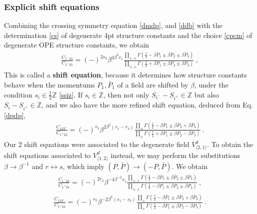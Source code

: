 \documentclass[12pt, a4paper]{article}
\newcommand{\myindex}[1]{\textbf{\boldmath #1}}
\theoremstyle{break}
\begin{document}
\subsubsection{Explicit shift equations}

Combining the crossing symmetry equation \eqref{dmdp}, and \eqref{ddb} with the determination \eqref{cs} of degenerate 4pt structure constants and the choice \eqref{cpcm} of degenerate OPE structure constants, we obtain
\begin{align}
 \boxed{\frac{C_{1^-23}}{C_{1^+23}} = 
 (-)^{2s_2}\beta^{4\beta^2r_1} \frac{\prod_{\pm,\pm}\Gamma\left(\tfrac12 -\beta\bar P_1\pm\beta \bar P_2\pm\beta \bar P_3\right)}{\prod_{\pm,\pm}
 \Gamma\left(\tfrac12 +\beta P_1\pm \beta P_2\pm\beta P_3\right)}} \ ,
 \label{sh-mp}
\end{align}
This is called a \myindex{shift equation}, because it determines how structure constants behave when the momentums $P_1,\bar P_1$ of a field are shifted by $\beta$, under the condition $s_i\in \frac12 \mathbb{Z}$ \eqref{ssiz}. If $s_i\in\mathbb{Z}$, then not only $S_{i^-}-S_{i^+}\in\mathbb{Z}$ but also $S_{i}-S_{i^+}\in\mathbb{Z}$, and we also have the more refined shift equation, deduced from Eq. \eqref{dpdp},
\begin{align}
 \boxed{\frac{C_{123^+}}{C_{1^+23}} = 
 (-)^{s_3} \beta^{2\beta^2(r_1-r_3)}
 \frac{ \prod_\pm\Gamma\left(\frac12 -\beta\bar P_1 \pm \beta\bar P_2 +\beta\bar P_3\right)}{ \prod_\pm\Gamma\left(\frac12+\beta P_1 \pm \beta P_2 -\beta P_3\right)}}\ .
 \label{sh-pp}
\end{align}
Our 2 shift equations were associated to the degenerate field $V^d_{\langle 2,1\rangle}$. To obtain the shift equations associated to $V^d_{\langle 1,2\rangle}$ instead, we may perform the substitutions $\beta\to \beta^{-1}$ and $r\leftrightarrow s$, which imply $(P,\bar P)\to (-P,\bar P)$. We obtain 
\begin{align}
 \frac{C_{1^-23}}{C_{1^+23}} = 
 (-)^{2r_2}\beta^{-4\beta^{-2}s_1} \frac{\prod_{\pm,\pm}\Gamma\left(\tfrac12 -\beta\bar P_1\pm\beta \bar P_2\pm\beta \bar P_3\right)}{\prod_{\pm,\pm}
 \Gamma\left(\tfrac12 -\beta P_1\pm \beta P_2\pm\beta P_3\right)} \ ,
 \label{sh-mp2}
\end{align}
\begin{align}
\frac{C_{123^+}}{C_{1^+23}} = 
 (-)^{s_3} \beta^{-2\beta^2(s_1-s_3)}
 \frac{ \prod_\pm\Gamma\left(\frac12 -\beta\bar P_1 \pm \beta\bar P_2 +\beta\bar P_3\right)}{ \prod_\pm\Gamma\left(\frac12-\beta P_1 \pm \beta P_2 -\beta P_3\right)}\ .
 \label{sh-pp2}
\end{align}
\end{document}
